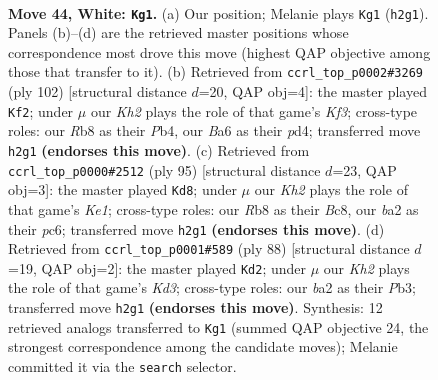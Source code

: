 \documentclass[11pt]{article}
\begin{document}
\clearpage

\begin{figure}[p]\centering
\begin{subfigure}{0.46\textwidth}\centering
\resizebox{\linewidth}{!}{%
\newchessgame
\chessboard[
  setfen={1R6/3r2k1/B7/4p3/7p/4Bp1P/b4P1K/8 w - - 16 44},
  showmover=false,
  pgfstyle=straightmove, color=movearrow, markmove={h2-g1}
]}
\caption{}
\end{subfigure}\hfill
\begin{subfigure}{0.46\textwidth}\centering
\resizebox{\linewidth}{!}{%
\newchessgame
\chessboard[
  setfen={4k3/8/6p1/1b1Bp1P1/1P1pP3/5K2/8/8 w - - 5 52},
  showmover=false,
  pgfstyle=straightmove, color=movearrow, markmove={f3-f2}
]}
\caption{}
\end{subfigure}
\\[4pt]
\begin{subfigure}{0.46\textwidth}\centering
\resizebox{\linewidth}{!}{%
\newchessgame
\chessboard[
  setfen={2b1k3/8/1pP5/p1b1B3/P3p3/1P4K1/4B3/8 b - - 13 48},
  showmover=false,
  pgfstyle=straightmove, color=movearrow, markmove={e8-d8}
]}
\caption{}
\end{subfigure}\hfill
\begin{subfigure}{0.46\textwidth}\centering
\resizebox{\linewidth}{!}{%
\newchessgame
\chessboard[
  setfen={8/3k4/1p6/2p1Bp2/P1P5/1P1K1B2/8/6r1 w - - 11 45},
  showmover=false,
  pgfstyle=straightmove, color=movearrow, markmove={d3-d2}
]}
\caption{}
\end{subfigure}
\caption{\textbf{Move 44, White: \texttt{Kg1}.} (a) Our position; Melanie plays \texttt{Kg1} (\texttt{h2g1}). Panels (b)--(d) are the retrieved master positions whose correspondence most drove this move (highest QAP objective among those that transfer to it). (b) Retrieved from \texttt{ccrl\_top\_p0002\#3269} (ply 102) [structural distance $d$=20, QAP obj=4]: the master played \texttt{Kf2}; under $\mu$ our \emph{Kh2} plays the role of that game's \emph{Kf3}; cross-type roles: our \emph{R}b8 as their \emph{P}b4, our \emph{B}a6 as their \emph{p}d4; transferred move \texttt{h2g1} \textbf{(endorses this move)}. (c) Retrieved from \texttt{ccrl\_top\_p0000\#2512} (ply 95) [structural distance $d$=23, QAP obj=3]: the master played \texttt{Kd8}; under $\mu$ our \emph{Kh2} plays the role of that game's \emph{Ke1}; cross-type roles: our \emph{R}b8 as their \emph{B}c8, our \emph{b}a2 as their \emph{p}c6; transferred move \texttt{h2g1} \textbf{(endorses this move)}. (d) Retrieved from \texttt{ccrl\_top\_p0001\#589} (ply 88) [structural distance $d$=19, QAP obj=2]: the master played \texttt{Kd2}; under $\mu$ our \emph{Kh2} plays the role of that game's \emph{Kd3}; cross-type roles: our \emph{b}a2 as their \emph{P}b3; transferred move \texttt{h2g1} \textbf{(endorses this move)}. Synthesis: 12 retrieved analogs transferred to \texttt{Kg1} (summed QAP objective 24, the strongest correspondence among the candidate moves); Melanie committed it via the \texttt{search} selector.}
\label{fig:thought-m86}
\end{figure}
\end{document}
